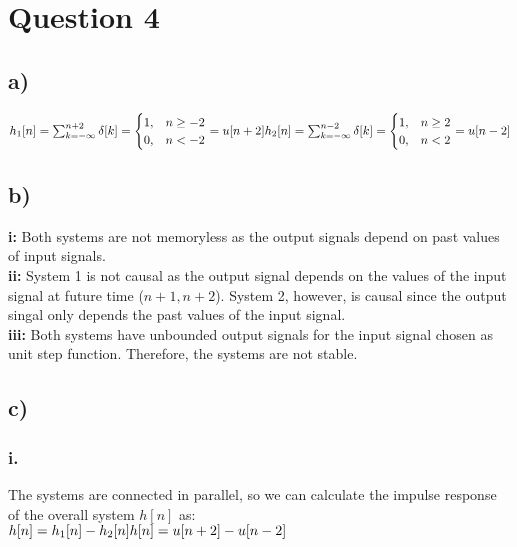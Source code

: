 \documentclass[12pt]{article}
\begin{document}
    \section*{Question 4}
    \subsection*{a)}
    \begin{math}
      h_1[n] = \sum_{k = -\infty}^{n+2}\delta [k] =
      \begin{cases}
        1,& n\geq -2\\
        0,& n < -2
    \end{cases} 
     = u[n+2]\\
     h_2[n] = \sum_{k = -\infty}^{n-2}\delta [k] =
     \begin{cases}
       1,& n\geq 2\\
       0,& n < 2
   \end{cases} 
    = u[n-2]
    \end{math}
    \subsection*{b)}
    \textbf{i: }Both systems are not memoryless as the output 
    signals depend on past values of input signals.\\
    \textbf{ii: }System 1 is not causal as the output signal depends
    on the values of the input signal at future time (\(n+1,n+2\)).
    System 2, however, is causal since the output singal only 
    depends the past values of the input signal.\\
    \textbf{iii: }Both systems have unbounded output signals for the input
    signal chosen as unit step function. Therefore, the 
    systems are not stable.
    \subsection*{c)}
    \subsubsection*{i.}
    The systems are connected in parallel, so we can calculate 
    the impulse response of the overall system \(h[n]\) as:\\
    \begin{math}
      h[n] = h_1[n] - h_2[n]\\
      h[n] = u[n+2] - u[n-2]\\
    \end{math}
\end{document}
